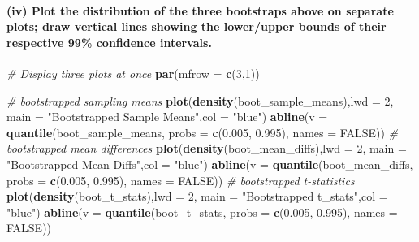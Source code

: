 \documentclass[
]{article}
\newenvironment{Shaded}{\begin{snugshade}}{\end{snugshade}}
\newcommand{\AttributeTok}[1]{\textcolor[rgb]{0.13,0.29,0.53}{#1}}
\newcommand{\CommentTok}[1]{\textcolor[rgb]{0.56,0.35,0.01}{\textit{#1}}}
\newcommand{\ConstantTok}[1]{\textcolor[rgb]{0.56,0.35,0.01}{#1}}
\newcommand{\DecValTok}[1]{\textcolor[rgb]{0.00,0.00,0.81}{#1}}
\newcommand{\FloatTok}[1]{\textcolor[rgb]{0.00,0.00,0.81}{#1}}
\newcommand{\FunctionTok}[1]{\textcolor[rgb]{0.13,0.29,0.53}{\textbf{#1}}}
\newcommand{\NormalTok}[1]{#1}
\newcommand{\StringTok}[1]{\textcolor[rgb]{0.31,0.60,0.02}{#1}}
\begin{document}
\hypertarget{iv-plot-the-distribution-of-the-three-bootstraps-above-on-separate-plots-draw-vertical-lines-showing-the-lowerupper-bounds-of-their-respective-99-confidence-intervals.}{%
\paragraph{(iv) Plot the distribution of the three bootstraps above on
separate plots; draw vertical lines showing the lower/upper bounds of
their respective 99\% confidence
intervals.}\label{iv-plot-the-distribution-of-the-three-bootstraps-above-on-separate-plots-draw-vertical-lines-showing-the-lowerupper-bounds-of-their-respective-99-confidence-intervals.}}

\begin{Shaded}
\begin{Highlighting}[]
\CommentTok{\# Display three plots at once}
\FunctionTok{par}\NormalTok{(}\AttributeTok{mfrow =} \FunctionTok{c}\NormalTok{(}\DecValTok{3}\NormalTok{,}\DecValTok{1}\NormalTok{))}

\CommentTok{\# bootstrapped sampling means}
\FunctionTok{plot}\NormalTok{(}\FunctionTok{density}\NormalTok{(boot\_sample\_means),}\AttributeTok{lwd =} \DecValTok{2}\NormalTok{, }\AttributeTok{main =} \StringTok{"Bootstrapped Sample Means"}\NormalTok{,}\AttributeTok{col =} \StringTok{"blue"}\NormalTok{) }
\FunctionTok{abline}\NormalTok{(}\AttributeTok{v =} \FunctionTok{quantile}\NormalTok{(boot\_sample\_means, }\AttributeTok{probs =} \FunctionTok{c}\NormalTok{(}\FloatTok{0.005}\NormalTok{, }\FloatTok{0.995}\NormalTok{), }\AttributeTok{names =} \ConstantTok{FALSE}\NormalTok{))}
\CommentTok{\# bootstrapped mean differences}
\FunctionTok{plot}\NormalTok{(}\FunctionTok{density}\NormalTok{(boot\_mean\_diffs),}\AttributeTok{lwd =} \DecValTok{2}\NormalTok{, }\AttributeTok{main =} \StringTok{"Bootstrapped Mean Diffs"}\NormalTok{,}\AttributeTok{col =} \StringTok{"blue"}\NormalTok{)}
\FunctionTok{abline}\NormalTok{(}\AttributeTok{v =} \FunctionTok{quantile}\NormalTok{(boot\_mean\_diffs, }\AttributeTok{probs =} \FunctionTok{c}\NormalTok{(}\FloatTok{0.005}\NormalTok{, }\FloatTok{0.995}\NormalTok{), }\AttributeTok{names =} \ConstantTok{FALSE}\NormalTok{))}
\CommentTok{\# bootstrapped t{-}statistics}
\FunctionTok{plot}\NormalTok{(}\FunctionTok{density}\NormalTok{(boot\_t\_stats),}\AttributeTok{lwd =} \DecValTok{2}\NormalTok{, }\AttributeTok{main =} \StringTok{"Bootstrapped t\_stats"}\NormalTok{,}\AttributeTok{col =} \StringTok{"blue"}\NormalTok{)}
\FunctionTok{abline}\NormalTok{(}\AttributeTok{v =} \FunctionTok{quantile}\NormalTok{(boot\_t\_stats, }\AttributeTok{probs =} \FunctionTok{c}\NormalTok{(}\FloatTok{0.005}\NormalTok{, }\FloatTok{0.995}\NormalTok{), }\AttributeTok{names =} \ConstantTok{FALSE}\NormalTok{))}
\end{Highlighting}
\end{Shaded}
\end{document}
